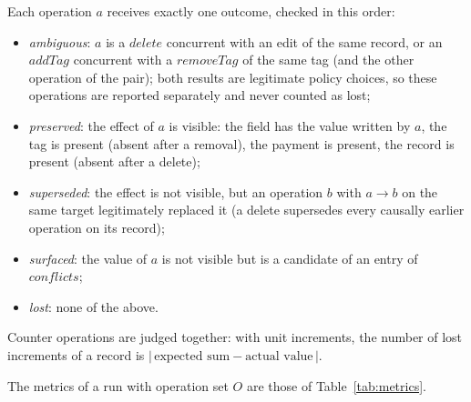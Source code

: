 \begin{definition}[Outcome]\label{def:outcome}
Each operation $a$ receives exactly one outcome, checked in this order:
\begin{itemize}
\item \emph{ambiguous}: $a$ is a $\mathit{delete}$ concurrent with an edit of the same record, or an
  $\mathit{addTag}$ concurrent with a $\mathit{removeTag}$ of the same tag (and the other operation of the pair);
  both results are legitimate policy choices, so these operations are reported separately and never counted as lost;
\item \emph{preserved}: the effect of $a$ is visible: the field has the value written by $a$, the tag is present
  (absent after a removal), the payment is present, the record is present (absent after a delete);
\item \emph{superseded}: the effect is not visible, but an operation $b$ with $a \to b$ on the same target
  legitimately replaced it (a delete supersedes every causally earlier operation on its record);
\item \emph{surfaced}: the value of $a$ is not visible but is a candidate of an entry of $\mathit{conflicts}$;
\item \emph{lost}: none of the above.
\end{itemize}
Counter operations are judged together: with unit increments, the number of lost increments of a record is
$|\,\text{expected sum} - \text{actual value}\,|$.
\end{definition}

\begin{definition}[Metrics]\label{def:metrics}
The metrics of a run with operation set $O$ are those of Table~\ref{tab:metrics}.
\end{definition}

